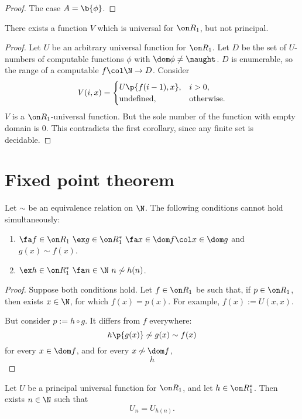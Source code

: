 \begin{proof}
  The case $A = \b{\phi}$.
\end{proof}

\begin{corollary}
  There exists a function $V$ which is universal for $\Comp_1$, but not principal.
\end{corollary}

\begin{proof}
  Let $U$ be an arbitrary universal function for $\Comp_1$.
  Let $D$ be the set of $U$-numbers of computable functions $\phi$ with $\dom \phi \ne \naught$.
  $D$ is enumerable, so the range of a computable $f \col \N \to D$.
  Consider
  $$
  V(i, x) =
  \begin{cases}
    U\p{f(i-1), x}, & i > 0, \\
    \und, & \oth.
  \end{cases}
  $$
  $V$ is a $\Comp_1$-universal function.
  But the sole number of the function with empty domain is 0.
  This contradicts the first corollary, since any finite set is decidable.
\end{proof}

\section{Fixed point theorem}

\begin{lemma}
  Let $\sim$ be an equivalence relation on $\N$.
  The following conditions cannot hold simultaneously:
  \begin{enumerate}
    \item $\fa f \in \Comp_1\ \ex g \in \Comp_1^*\ \fa x \in \dom f \col x \in \dom g$ and $g(x) \sim f(x)$.
    \item $\ex h \in \Comp_1^*\ \fa n \in \N \ n \not\sim h(n)$.
  \end{enumerate}
\end{lemma}

\begin{proof}
  Suppose both conditions hold.
  Let $f \in \Comp_1$ be such that, if $p \in \Comp_1$, then exists $x \in \N$, for which $f(x) = p(x)$.
  For example, $f(x) := U(x, x)$.
  
  But consider $p := h \circ g$.
  It differs from $f$ everywhere:
  $$ h\p{g(x)} \not\sim g(x) \sim f(x) $$
  for every $x \in \dom f$, and for every $x \not\sim \dom f$,
  $$ h $$
\end{proof}

\begin{theorem}
  Let $U$ be a principal universal function for $\Comp_1$, and let $h \in \Comp_1^*$.
  Then exists $n \in \N$ such that
  $$ U_n = U_{h(n)}. $$
\end{theorem}

